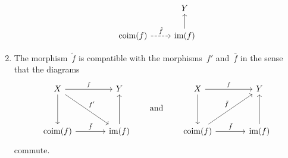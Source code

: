 \begin{lemma}
\begin{enumerate}
\begin{equation}
\begin{tikzcd}
          & Y
          \\
            \coim(f)
            \arrow[dashed]{r}[above]{\tilde{f}}
          & \im(f)
            \arrow{u}
        \end{tikzcd}
      \end{equation}
    \item
      The morphism~$\tilde{f}$ is compatible with the morphisms~$f'$ and~$\bar{f}$ in the sense that the diagrams
      \begin{equation}
        \label{compatibility of induced morphisms}
        \begin{tikzcd}[column sep = large, row sep = huge]
            X
            \arrow{r}[above]{f}
            \arrow{dr}[above right]{f'}
            \arrow{d}
          & Y
          \\
            \coim(f)
            \arrow{r}[above]{\tilde{f}}
          & \im(f)
            \arrow{u}
        \end{tikzcd}
        \qquad\text{and}\qquad
        \begin{tikzcd}[column sep = large, row sep = huge]
            X
            \arrow{r}[above]{f}
            \arrow{d}
          & Y
          \\
            \coim(f)
            \arrow{r}[above]{\tilde{f}}
            \arrow{ur}[above left]{\bar{f}}
          & \im(f)
            \arrow{u}
        \end{tikzcd}
      \end{equation}
      commute.
  \end{enumerate}
\end{lemma}


